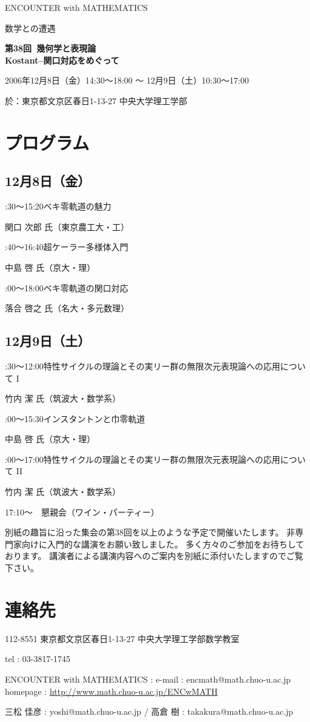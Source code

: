 \documentclass[uplatex,dvipdfmx]{jlreq}
\newcommand{\talk}[3]{%
\noindent
#1\quad #2\par
\hspace*{2em}#3\par\smallskip
}
\newcommand{\EwMnumber}{第38回}
\newcommand{\EwMtitle}{幾何学と表現論\\[2mm]\large Kostant–関口対応をめぐって}
\newcommand{\EwMdate}{2006年12月8日（金）14:30～18:00 ～ 12月9日（土）10:30～17:00}
\newcommand{\EwMplace}{東京都文京区春日1-13-27 中央大学理工学部}
\newcommand{\EwMtitleblock}{

\vspace*{-5mm}

\begin{center}

{\Large ENCOUNTER with MATHEMATICS}

\vspace{2mm}

{\large 数学との遭遇}

\vspace{4mm}

{\Large \bfseries \EwMnumber\ \EwMtitle}

\vspace{4mm}

\EwMdate

\vspace{2mm}

於：\EwMplace

\end{center}

\vspace{2mm}

}
\begin{document}
\EwMtitleblock


\section*{プログラム}

\subsection*{12月8日（金）}

\talk
{14:30～15:20}
{ベキ零軌道の魅力}
{関口 次郎 氏（東京農工大・工）}

\talk
{15:40～16:40}
{超ケーラー多様体入門}
{中島 啓 氏（京大・理）}

\talk
{17:00～18:00}
{ベキ零軌道の関口対応}
{落合 啓之 氏（名大・多元数理）}

\subsection*{12月9日（土）}

\talk
{10:30～12:00}
{特性サイクルの理論とその実リー群の無限次元表現論への応用について I}
{竹内 潔 氏（筑波大・数学系）}

\talk
{14:00～15:30}
{インスタントンと巾零軌道}
{中島 啓 氏（京大・理）}

\talk
{16:00～17:00}
{特性サイクルの理論とその実リー群の無限次元表現論への応用について II}
{竹内 潔 氏（筑波大・数学系）}

\bigskip

17:10～　懇親会（ワイン・パーティー）


\bigskip

別紙の趣旨に沿った集会の第38回を以上のような予定で開催いたします。  
非専門家向けに入門的な講演をお願い致しました。  
多く方々のご参加をお待ちしております。  
講演者による講演内容へのご案内を別紙に添付いたしますのでご覧下さい。


\section*{連絡先}

112-8551 東京都文京区春日1-13-27 中央大学理工学部数学教室 

tel : 03-3817-1745  

ENCOUNTER with MATHEMATICS : e-mail : encmath@math.chuo-u.ac.jp  
homepage : \url{http://www.math.chuo-u.ac.jp/ENCwMATH}  

三松 佳彦 : yoshi@math.chuo-u.ac.jp / 高倉 樹 : takakura@math.chuo-u.ac.jp
\end{document}
